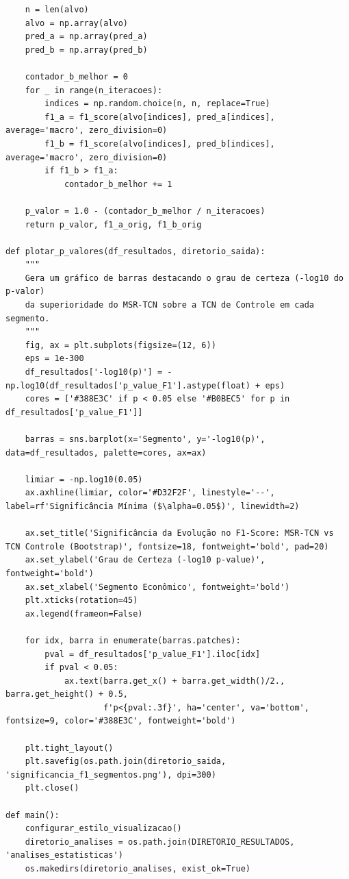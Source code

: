 \documentclass{article}
\begin{document}
\begin{verbatim}
    n = len(alvo)
    alvo = np.array(alvo)
    pred_a = np.array(pred_a)
    pred_b = np.array(pred_b)
    
    contador_b_melhor = 0
    for _ in range(n_iteracoes):
        indices = np.random.choice(n, n, replace=True)
        f1_a = f1_score(alvo[indices], pred_a[indices], average='macro', zero_division=0)
        f1_b = f1_score(alvo[indices], pred_b[indices], average='macro', zero_division=0)
        if f1_b > f1_a:
            contador_b_melhor += 1
            
    p_valor = 1.0 - (contador_b_melhor / n_iteracoes)
    return p_valor, f1_a_orig, f1_b_orig

def plotar_p_valores(df_resultados, diretorio_saida):
    """
    Gera um gráfico de barras destacando o grau de certeza (-log10 do p-valor)
    da superioridade do MSR-TCN sobre a TCN de Controle em cada segmento.
    """
    fig, ax = plt.subplots(figsize=(12, 6))
    eps = 1e-300
    df_resultados['-log10(p)'] = -np.log10(df_resultados['p_value_F1'].astype(float) + eps)
    cores = ['#388E3C' if p < 0.05 else '#B0BEC5' for p in df_resultados['p_value_F1']]
    
    barras = sns.barplot(x='Segmento', y='-log10(p)', data=df_resultados, palette=cores, ax=ax)
    
    limiar = -np.log10(0.05)
    ax.axhline(limiar, color='#D32F2F', linestyle='--', label=rf'Significância Mínima ($\alpha=0.05$)', linewidth=2)
    
    ax.set_title('Significância da Evolução no F1-Score: MSR-TCN vs TCN Controle (Bootstrap)', fontsize=18, fontweight='bold', pad=20)
    ax.set_ylabel('Grau de Certeza (-log10 p-value)', fontweight='bold')
    ax.set_xlabel('Segmento Econômico', fontweight='bold')
    plt.xticks(rotation=45)
    ax.legend(frameon=False)
    
    for idx, barra in enumerate(barras.patches):
        pval = df_resultados['p_value_F1'].iloc[idx]
        if pval < 0.05:
            ax.text(barra.get_x() + barra.get_width()/2., barra.get_height() + 0.5,
                    f'p<{pval:.3f}', ha='center', va='bottom', fontsize=9, color='#388E3C', fontweight='bold')

    plt.tight_layout()
    plt.savefig(os.path.join(diretorio_saida, 'significancia_f1_segmentos.png'), dpi=300)
    plt.close()

def main():
    configurar_estilo_visualizacao()
    diretorio_analises = os.path.join(DIRETORIO_RESULTADOS, 'analises_estatisticas')
    os.makedirs(diretorio_analises, exist_ok=True)
    

\end{verbatim}
\end{document}
